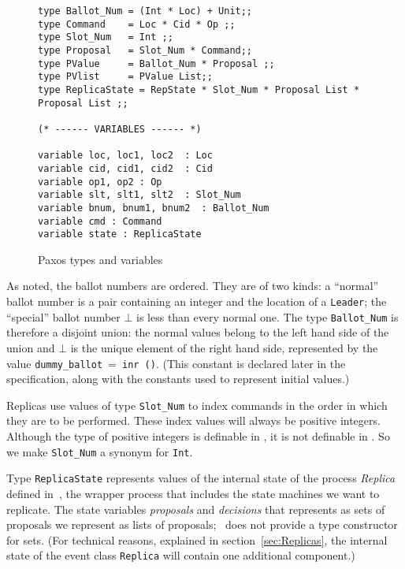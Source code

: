 \documentclass[final]{article}
\begin{document}
\begin{figure}%
  \begin{lstlisting}[basicstyle=\small]
type Ballot_Num = (Int * Loc) + Unit;;
type Command    = Loc * Cid * Op ;;
type Slot_Num   = Int ;;
type Proposal   = Slot_Num * Command;;
type PValue     = Ballot_Num * Proposal ;;
type PVlist     = PValue List;;
type ReplicaState = RepState * Slot_Num * Proposal List * Proposal List ;;

(* ------ VARIABLES ------ *)

variable loc, loc1, loc2  : Loc
variable cid, cid1, cid2  : Cid
variable op1, op2 : Op
variable slt, slt1, slt2  : Slot_Num
variable bnum, bnum1, bnum2  : Ballot_Num
variable cmd : Command
variable state : ReplicaState

  \end{lstlisting}
  \caption{Paxos types and variables}
  \label{fig:Paxos-types}
\end{figure}

As noted, the ballot numbers are ordered.  They are of two kinds: a
``normal'' ballot number is a pair containing an integer and the
location of a \lstinline{Leader}; the ``special'' ballot number $\bot$
is less than every normal one.  The type \lstinline{Ballot_Num} is
therefore a disjoint union: the normal values belong to the left hand
side of the union and $\bot$ is the unique element of the right hand
side, represented by the value
\lstinline{dummy_ballot}~=~\lstinline{inr ()}.  (This constant is
declared later in the specification, along with the constants used to
represent initial values.)

Replicas use values of type \lstinline{Slot_Num} to index commands in
the order in which they are to be performed.  These index values will
always be positive integers.  Although the type of positive integers
is definable in \nuprl, it is not definable in \eml.  So we make
\lstinline{Slot_Num} a synonym for \lstinline{Int}.

Type \lstinline{ReplicaState} represents values of the internal state
of the process \emph{Replica} defined in~\cite{VanRenesse:2011}, the
wrapper process that includes the state machines we want to replicate.
The state variables \emph{proposals} and \emph{decisions} that
\cite{VanRenesse:2011} represents as sets of proposals we represent as
lists of proposals; \eml\ does not provide a type constructor for
sets.  (For technical reasons, explained in
section~\ref{sec:Replicas}, the internal state of the event class
\lstinline{Replica} will contain one additional component.)
\end{document}
